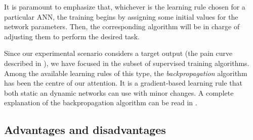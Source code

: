 It is paramount to emphasize that, whichever is the learning rule chosen for 
a particular ANN, the training begins by assigning some initial values for the network parameters. Then, the corresponding algorithm will be in charge of adjusting them to perform the desired task.

Since our experimental scenario considers a target output (the pain curve described in ), we have focused in the subset of supervised training algorithms. 
Among the available learning rules of this type, the \emph{backpropagation} algorithm has been the centre of our attention. It is a gradient-based learning rule that both static an dynamic networks can use with minor changes. A complete explanation of the backpropagation algorithm can be read in .


\subsection{Advantages and disadvantages}




